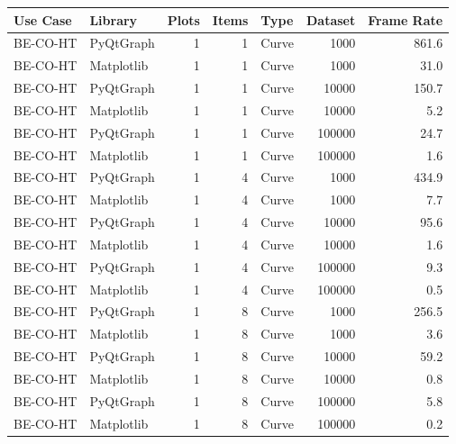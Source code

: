 \begin{table}[h]
\begin{center}

\label{tab:application:usecases:results:ht}

\begin{tabular}{llrrlrr}

\hline
Use Case  & Library    & Plots & Items & Type    & Dataset & Frame Rate  \\
\hline
BE-CO-HT  & PyQtGraph  & 1     & 1     & Curve   & 1000    & 861.6       \\
BE-CO-HT  & Matplotlib & 1     & 1     & Curve   & 1000    & 31.0        \\
BE-CO-HT  & PyQtGraph  & 1     & 1     & Curve   & 10000   & 150.7       \\
BE-CO-HT  & Matplotlib & 1     & 1     & Curve   & 10000   & 5.2         \\
BE-CO-HT  & PyQtGraph  & 1     & 1     & Curve   & 100000  & 24.7        \\
BE-CO-HT  & Matplotlib & 1     & 1     & Curve   & 100000  & 1.6         \\
\hline
BE-CO-HT  & PyQtGraph  & 1     & 4     & Curve   & 1000    & 434.9       \\
BE-CO-HT  & Matplotlib & 1     & 4     & Curve   & 1000    & 7.7         \\
BE-CO-HT  & PyQtGraph  & 1     & 4     & Curve   & 10000   & 95.6        \\
BE-CO-HT  & Matplotlib & 1     & 4     & Curve   & 10000   & 1.6         \\
BE-CO-HT  & PyQtGraph  & 1     & 4     & Curve   & 100000  & 9.3         \\
BE-CO-HT  & Matplotlib & 1     & 4     & Curve   & 100000  & 0.5         \\
\hline
BE-CO-HT  & PyQtGraph  & 1     & 8     & Curve   & 1000    & 256.5       \\
BE-CO-HT  & Matplotlib & 1     & 8     & Curve   & 1000    & 3.6         \\
BE-CO-HT  & PyQtGraph  & 1     & 8     & Curve   & 10000   & 59.2        \\
BE-CO-HT  & Matplotlib & 1     & 8     & Curve   & 10000   & 0.8         \\
BE-CO-HT  & PyQtGraph  & 1     & 8     & Curve   & 100000  & 5.8         \\
BE-CO-HT  & Matplotlib & 1     & 8     & Curve   & 100000  & 0.2         \\
\hline

\end{tabular}
\end{center}
\end{table}

